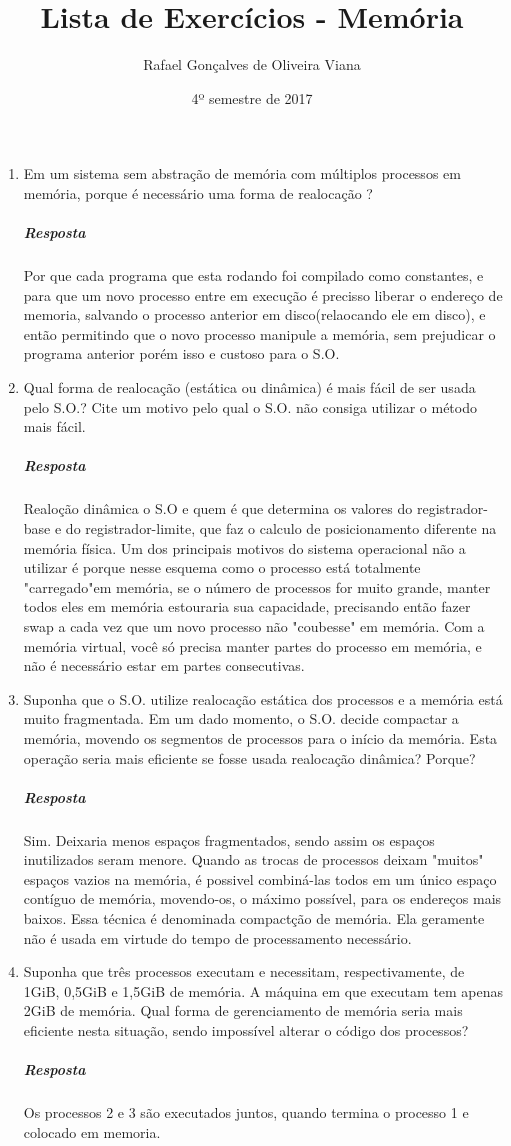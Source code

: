 \documentclass[12pt]{article}
\title{Lista de Exercícios - Memória}
\author{Rafael Gonçalves de Oliveira Viana}
\date{4º semestre de 2017}
\begin{document}
\maketitle

\begin{enumerate}
\item
Em um sistema sem abstração de memória com múltiplos processos em
memória, porque é necessário uma forma de realocação ?
\subparagraph{Resposta}
Por que cada programa que esta rodando foi compilado como constantes, e para que um novo processo entre em execução é precisso liberar o endereço de memoria, salvando o processo anterior em disco(relaocando ele em disco), e então permitindo que o novo processo manipule a memória, sem prejudicar o programa anterior porém isso e custoso para o S.O.
\item
Qual forma de realocação (estática ou dinâmica) é mais fácil de ser
usada pelo S.O.? Cite um motivo pelo qual o S.O. não consiga utilizar
o método mais fácil.
\subparagraph{Resposta}
Realoção dinâmica o S.O  e quem é que determina os valores do registrador-base e do registrador-limite, que faz o calculo de posicionamento diferente na memória física. Um dos principais motivos do sistema operacional não a utilizar é porque nesse esquema como o processo está totalmente "carregado"em memória, se o número de processos for muito grande, manter todos eles em memória estouraria sua capacidade, precisando então fazer swap a cada vez que um novo processo não "coubesse" em memória. Com a memória virtual, você só precisa manter partes do processo em memória, e não é necessário estar em partes consecutivas. 

\item
Suponha que o S.O. utilize realocação estática dos processos e a
memória está muito fragmentada. Em um dado momento, o S.O. decide
compactar a memória, movendo os segmentos de processos para o início
da memória. Esta operação seria mais eficiente se fosse usada
realocação dinâmica? Porque?
\subparagraph{Resposta}
	Sim. Deixaria menos espaços fragmentados, sendo assim os espaços inutilizados seram menore. Quando as trocas de processos deixam "muitos" espaços vazios na memória, é possivel combiná-las todos em um único espaço contíguo de memória, movendo-os, o máximo possível, para os endereços mais baixos. Essa técnica é denominada compactção de memória. Ela geramente não é usada em virtude do tempo de processamento necessário.

\item
Suponha que três processos executam e necessitam, respectivamente, de
1GiB, 0,5GiB e 1,5GiB de memória. A máquina em que executam tem apenas
2GiB de memória. Qual forma de gerenciamento de memória seria mais
eficiente nesta situação, sendo impossível alterar o código dos
processos?
\subparagraph{Resposta}
Os processos 2 e 3 são executados juntos, quando termina o processo 1 e colocado em memoria.


\end{enumerate}
\end{document}
